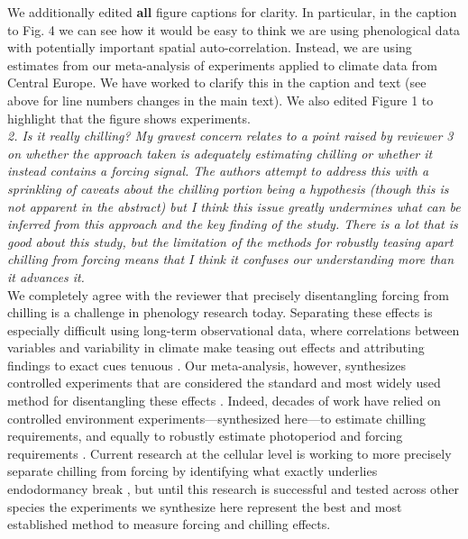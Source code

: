 \documentclass{article}
\begin{document}
{We additionally edited {\bf all} figure captions for clarity. In particular, in the caption to Fig. 4 we can see how it would be easy to think we are using phenological data with potentially important spatial auto-correlation. Instead, we are using estimates from our meta-analysis of experiments applied to climate data from Central Europe. We have worked to clarify this in the caption and text (see above for line numbers changes in the main text). We also edited Figure 1 to highlight that the figure shows experiments. \\

\emph{2. Is it really chilling? My gravest concern relates to a point raised by reviewer 3 on whether the
approach taken is adequately estimating chilling or whether it instead contains a forcing signal.
The authors attempt to address this with a sprinkling of caveats about the chilling portion
being a hypothesis (though this is not apparent in the abstract) but I think this issue greatly
undermines what can be inferred from this approach and the key finding of the study. There is
a lot that is good about this study, but the limitation of the methods for robustly teasing apart
chilling from forcing means that I think it confuses our understanding more than it advances it.}\\

We completely agree with the reviewer that precisely disentangling forcing from chilling is a challenge in phenology research today. Separating these effects is especially difficult using long-term observational data, where correlations between variables and variability in climate make teasing out effects and attributing findings to exact cues tenuous \citep[e.g.,][]{fu2015}. Our meta-analysis, however, synthesizes controlled experiments that are considered the standard and most widely used method for disentangling these effects \citep{samish1954,frostbook,chuinearees}. Indeed, decades of work have relied on controlled environment experiments---synthesized here---to estimate chilling requirements, and equally to robustly estimate photoperiod and forcing requirements \citep[e.g.][]{Junttila:2012aa, Worrall:1967aa}. Current research at the cellular level is working to more precisely separate chilling from forcing by identifying what exactly underlies endodormancy break \citep[e.g., work on the compound callous, see][]{rinne2011,vanderschoot2014}, but until this research is successful and tested across other species the experiments we synthesize here represent the best and most established method to measure forcing and chilling effects. \\

}
\end{document}
